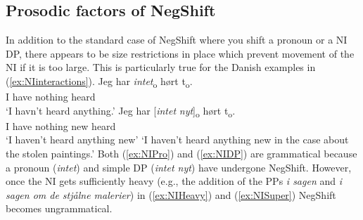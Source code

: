 \documentclass[12pt, letterpaper]{article}
\begin{document}
\subsection{Prosodic factors of NegShift} \label{sec:Confound}

In addition to the standard case of NegShift where you shift a pronoun or a NI DP, there appears to be size restrictions in place which prevent movement of the NI if it is too large. This is particularly true for the Danish examples in (\ref{ex:NIinteractions}). 
	\ea\label{ex:NIinteractions}
		\ea
		\gll Jeg har \textit{intet}\textsubscript{o} hørt t\textsubscript{o}.\\
		I have nothing heard\\
		\glt  `I havn't heard anything.'\label{ex:NIPro}
		\ex 
		\gll Jeg har [\textit{intet} \textit{nyt}]\textsubscript{o} hørt t\textsubscript{o}.\\
		I have nothing new heard\\
		\glt `I haven't heard anything new'\label{ex:NIDP}
		\glt `I haven't heard anything new in the case about the stolen paintings.'\label{ex:NISuper}
		\z 
	\z
Both (\ref{ex:NIPro}) and (\ref{ex:NIDP}) are grammatical because a pronoun (\emph{intet}) and simple DP (\emph{intet nyt}) have undergone NegShift. However, once the NI gets sufficiently heavy (e.g., the addition of the PPs \emph{i sagen} and \emph{i sagen om de stjålne malerier}) in (\ref{ex:NIHeavy}) and (\ref{ex:NISuper}) NegShift becomes ungrammatical. 
\end{document}
